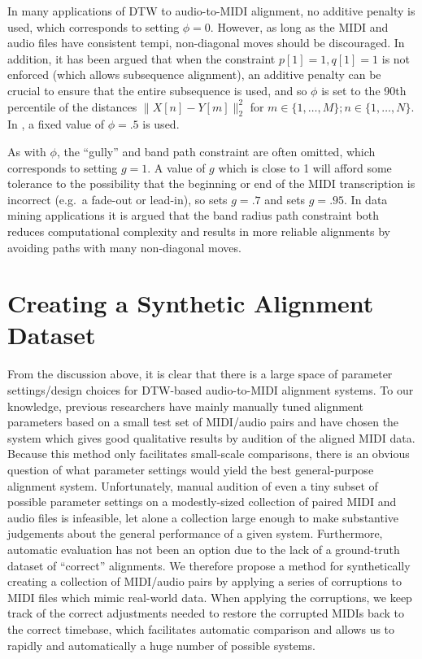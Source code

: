 \documentclass{article}
\begin{document}
\begin{description}[topsep=1pt,itemsep=-1pt,leftmargin=5pt]
\item[Penalty ($\phi$):] In many applications of DTW to audio-to-MIDI alignment, no additive penalty is used, which corresponds to setting $\phi = 0$.
However, as long as the MIDI and audio files have consistent tempi, non-diagonal moves should be discouraged.
In addition, it has been argued \cite{raffel2015large} that when the constraint $p[1] = 1, q[1] = 1$ is not enforced (which allows subsequence alignment), an additive penalty can be crucial to ensure that the entire subsequence is used, and so $\phi$ is set to the 90th percentile of the distances $\|X[n] - Y[m]\|_2^2$ for $m \in \{1, \ldots, M\}; n \in \{1, \ldots, N\}$.
In \cite{ellis2013aligning}, a fixed value of $\phi = .5$ is used.
\item[Gully ($g$) and band path constraint:] As with $\phi$, the ``gully'' and band path constraint are often omitted, which corresponds to setting $g = 1$.
A value of $g$ which is close to 1 will afford some tolerance to the possibility that the beginning or end of the MIDI transcription is incorrect (e.g.\ a fade-out or lead-in), so \cite{ellis2013aligning} sets $g = .7$ and \cite{raffel2015large} sets $g = .95$.
In data mining applications \cite{ratanamahatana2004everything} it is argued that the band radius path constraint both reduces computational complexity and results in more reliable alignments by avoiding paths with many non-diagonal moves.
\end{description}

\section{Creating a Synthetic Alignment Dataset}
\label{sec:synthetic}

From the discussion above, it is clear that there is a large space of parameter settings/design choices for DTW-based audio-to-MIDI alignment systems.
To our knowledge, previous researchers have mainly manually tuned alignment parameters based on a small test set of MIDI/audio pairs and have chosen the system which gives good qualitative results by audition of the aligned MIDI data.
Because this method only facilitates small-scale comparisons, there is an obvious question of what parameter settings would yield the best general-purpose alignment system.
Unfortunately, manual audition of even a tiny subset of possible parameter settings on a modestly-sized collection of paired MIDI and audio files is infeasible, let alone a collection large enough to make substantive judgements about the general performance of a given system.
Furthermore, automatic evaluation has not been an option due to the lack of a ground-truth dataset of ``correct'' alignments.
We therefore propose a method for synthetically creating a collection of MIDI/audio pairs by applying a series of corruptions to MIDI files which mimic real-world data.
When applying the corruptions, we keep track of the correct adjustments needed to restore the corrupted MIDIs back to the correct timebase, which facilitates automatic comparison and allows us to rapidly and automatically a huge number of possible systems.
\end{document}

